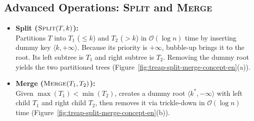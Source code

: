 \FloatBarrier
\subsection{Advanced Operations: \textsc{Split} and \textsc{Merge}}
\begin{itemize}
    \item \textbf{Split ($\textsc{Split}(T, k)$):}\\
    Partitions $T$ into $T_1$ ($\le k$) and $T_2$ ($> k$) in $\mathcal{O}(\log n)$ time by inserting dummy key $\langle k, +\infty \rangle$. Because its priority is $+\infty$, bubble-up brings it to the root. Its left subtree is $T_1$ and right subtree is $T_2$. Removing the dummy root yields the two partitioned trees (Figure~\ref{fig:treap-split-merge-concept-en}(a)).
    
    \item \textbf{Merge ($\textsc{Merge}(T_1, T_2)$):}\\
    Given $\max(T_1) < \min(T_2)$, creates a dummy root $\langle k^*, -\infty \rangle$ with left child $T_1$ and right child $T_2$, then removes it via trickle-down in $\mathcal{O}(\log n)$ time (Figure~\ref{fig:treap-split-merge-concept-en}(b)).
\end{itemize}

